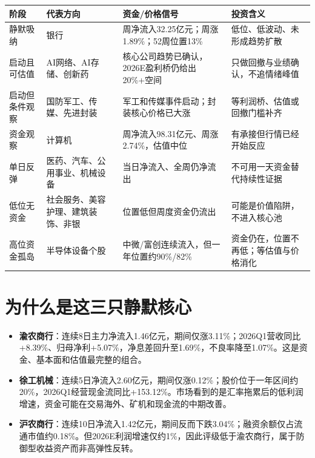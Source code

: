 \begin{exhibitbox}
\begin{tabularx}{\textwidth}{L{3.0cm}L{2.4cm}L{2.4cm}X}
\toprule
\textbf{阶段} & \textbf{代表方向} & \textbf{资金/价格信号} & \textbf{投资含义} \\
\midrule
静默吸纳 & 银行 & 周净流入32.25亿元；周涨1.89\%；52周位置13\% & 低位、低波动、未形成趋势扩散 \\
启动且可估值 & AI网络、AI存储、创新药 & 核心公司趋势已确认，2026E盈利桥仍给出20\%+空间 & 只做回撤与业绩确认，不追情绪峰值 \\
启动但条件观察 & 国防军工、传媒、先进封装 & 军工和传媒事件启动；封装核心价格已大涨 & 等利润桥、估值或回撤门槛补齐 \\
资金观察 & 计算机 & 周净流入98.31亿元、周涨2.74\%，估值中位 & 有承接但行情已经开始反应 \\
单日反弹 & 医药、汽车、公用事业、机械设备 & 当日净流入、全周仍净流出 & 不可用一天资金替代持续性证据 \\
低位无资金 & 社会服务、美容护理、建筑装饰、非银 & 位置低但周度资金仍流出 & 可能是价值陷阱，不进入核心池 \\
高位资金孤岛 & 半导体设备个股 & 中微/富创连续流入，但一年位置约90\%/82\% & 资金仍在，位置不再低；等估值与价格消化 \\
\bottomrule
\end{tabularx}
\end{exhibitbox}

\section{为什么是这三只静默核心}

\begin{itemize}
  \item \textbf{渝农商行}：连续8日主力净流入1.46亿元，期间仅涨3.11\%；2026Q1营收同比+8.39\%、归母净利+5.07\%，净息差回升至1.69\%，不良率降至1.07\%。这是资金、基本面和估值最完整的组合。
  \item \textbf{徐工机械}：连续5日净流入2.60亿元，期间仅涨0.12\%；股价位于一年区间约20\%，2026Q1经营现金流同比+153.12\%。市场看到的是汇率拖累后的低利润增速，资金可能在交易海外、矿机和现金流的中期改善。
  \item \textbf{沪农商行}：连续10日净流入1.42亿元，期间反而下跌3.04\%；融资余额仅占流通市值约0.18\%。但2026E利润增速仅约1\%，因此评级低于渝农商行，属于防御型收益资产而非高弹性反转。
\end{itemize}


